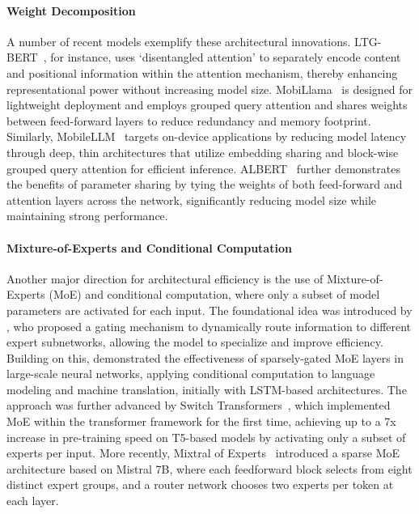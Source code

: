 \paragraph{Weight Decomposition}
A number of recent models exemplify these architectural innovations. LTG-BERT~\citep{samuel2023ltgbert}, for instance, uses `disentangled attention' to separately encode content and positional information within the attention mechanism, thereby enhancing representational power without increasing model size. MobiLlama~\citep{thawakar2024mobillama} is designed for lightweight deployment and employs grouped query attention and shares weights between feed-forward layers to reduce redundancy and memory footprint. Similarly, MobileLLM~\citep{liu2024mobilellm} targets on-device applications by reducing model latency through deep, thin architectures that utilize embedding sharing and block-wise grouped query attention for efficient inference. ALBERT~\citep{lan2019albert} further demonstrates the benefits of parameter sharing by tying the weights of both feed-forward and attention layers across the network, significantly reducing model size while maintaining strong performance.

\paragraph{Mixture-of-Experts and Conditional Computation}
Another major direction for architectural efficiency is the use of Mixture-of-Experts (MoE) and conditional computation, where only a subset of model parameters are activated for each input. The foundational idea was introduced by \citet{jacobs1991adaptive}, who proposed a gating mechanism to dynamically route information to different expert subnetworks, allowing the model to specialize and improve efficiency. Building on this, \citet{shazeer2017outrageously} demonstrated the effectiveness of sparsely-gated MoE layers in large-scale neural networks, applying conditional computation to language modeling and machine translation, initially with LSTM-based architectures. The approach was further advanced by Switch Transformers~\citep{fedus2021switch}, which implemented MoE within the transformer framework for the first time, achieving up to a 7x increase in pre-training speed on T5-based models by activating only a subset of experts per input. More recently, Mixtral of Experts~\citep{jiang2024mixtral} introduced a sparse MoE architecture based on Mistral 7B, where each feedforward block selects from eight distinct expert groups, and a router network chooses two experts per token at each layer. %

